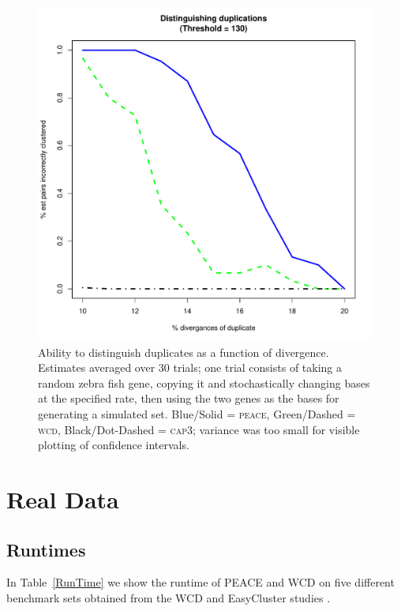 \documentclass[a4paper,12pt]{article}
\newcommand{\peace} {{\small PEACE}}
\newcommand{\wcd} {{\small WCD}}
\begin{document}
\begin{appendix}
\begin{figure}[tbp]
\centerline{
\includegraphics[scale=0.35]{pics.d/duplicates_130.pdf}
}
\caption{Ability to distinguish duplicates as a function of
  divergence.  Estimates averaged over 30 trials; one trial consists
  of taking a random zebra fish gene, copying it and stochastically changing bases
  at the specified rate, then using the two genes as the bases for
  generating a simulated set. Blue/Solid = \textsc{peace}, Green/Dashed = \textsc{wcd}, Black/Dot-Dashed = \textsc{cap3};
  variance was too small for visible plotting of
  confidence intervals.}\label{dups130}
\end{figure}

\section{Real Data}

\subsection{Runtimes}

In Table~\ref{RunTime} we show the runtime of \peace\/ and \wcd\/ on
five different benchmark sets obtained from the WCD and EasyCluster
studies \cite{Hazelhurst08a,Picardi09}. 


\end{appendix}
\end{document}
